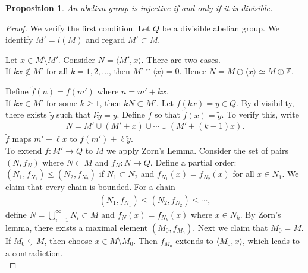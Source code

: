 \documentclass[12pt]{report}
\theoremstyle{plain}
\newtheorem{proposition}[theorem]{Proposition}
\theoremstyle{remark}
\theoremstyle{definition}
\newcommand{\Z}{\mathbb{Z}}
\begin{document}
\begin{proposition}
    An abelian group is injective if and only if it is divisible.
\end{proposition}
\begin{proof}
    We verify the first condition. Let $Q$ be a divisible abelian group. We identify $M'=i(M)$ and regard $M'\subset M$.
    \begin{figure}[H]
        \centering
    \end{figure}
    \noindent Let $x\in M\setminus M'$. Consider $N=\langle M',x\rangle$. There are two cases. \\
    If $kx\notin M'$ for all $k=1,2,\dots$, then $M'\cap \langle x\rangle = 0$. Hence $N=M\oplus \langle x\rangle \simeq M\oplus \Z$.
    \begin{figure}[H]
        \centering
    \end{figure}
    \noindent Define $\tilde{f}(n)=f(m')$ where $n=m'+kx$. \\
    If $kx\in M'$ for some $k\ge 1$, then $kN\subset  M'$. Let $f(kx)=y\in Q$. By divisibility, there exists $\tilde{y}$ such that $k\tilde{y}=y$. Define $\tilde{f}$ so that $\tilde{f}(x)=\tilde{y}$. To verify this, write
    \begin{align*}
        N=M'\cup (M'+x)\cup \cdots \cup (M'+(k-1)x).
    \end{align*}
    $\tilde{f}$ maps $m'+\ell x$ to $f(m')+\ell\tilde{y}$.\\
    To extend $f:M'\rightarrow Q$ to $M$ we apply Zorn's Lemma. Consider the set of pairs $(N,f_N)$ where $N\subset M$ and $f_N:N\rightarrow Q$. Define a partial order: $(N_1,f_{N_1})\le (N_2,f_{N_2})$ if $N_1\subset N_2$ and $f_{N_1}(x)=f_{N_2}(x)$ for all $x\in N_1$. We claim that every chain is bounded. For a chain
    \begin{align*}
        (N_1,f_{N_1})\le (N_2,f_{N_2})\le \cdots,
    \end{align*}
    define $N=\bigcup_{i=1}^\infty N_i\subset M$ and $f_N(x)=f_{N_k}(x)$ where $x\in N_k$. By Zorn's lemma, there exists a maximal element $(M_0,f_{M_0})$. Next we claim that $M_0=M$. If $M_0\subsetneq M$, then choose $x\in M\setminus M_0$. Then $f_{M_0}$ extends to $\langle M_0,x\rangle$, which leads to a contradiction.\\

\end{proof}
\end{document}
